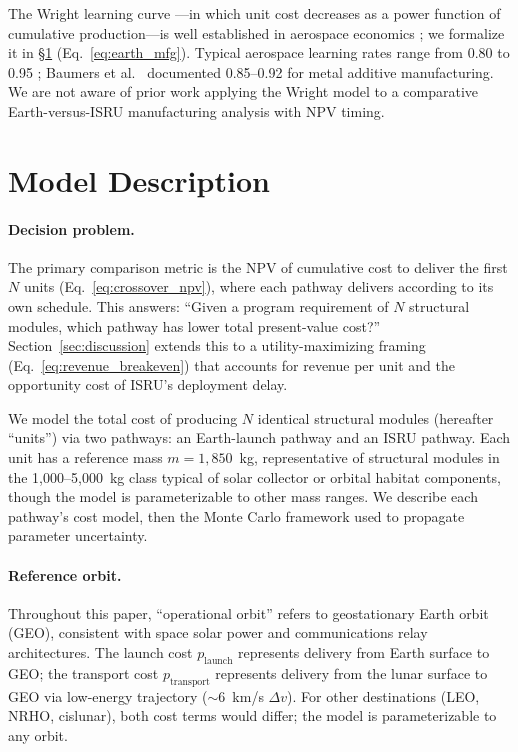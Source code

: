 \documentclass[5p,twocolumn]{elsarticle}
\begin{document}
The Wright learning curve \cite{wright1936}---in which unit cost decreases as a power function of cumulative production---is well established in aerospace economics \cite{dutton1984,argote1990,nagy2013}; we formalize it in \S\ref{sec:model} (Eq.~\ref{eq:earth_mfg}). Typical aerospace learning rates range from 0.80 to 0.95 \cite{wertz2011}; Baumers et al.\ \cite{baumers2016} documented 0.85--0.92 for metal additive manufacturing. We are not aware of prior work applying the Wright model to a comparative Earth-versus-ISRU manufacturing analysis with NPV timing.

\section{Model Description}
\label{sec:model}

\paragraph{Decision problem.} The primary comparison metric is the NPV of cumulative cost to deliver the first $N$ units (Eq.~\ref{eq:crossover_npv}), where each pathway delivers according to its own schedule. This answers: ``Given a program requirement of $N$ structural modules, which pathway has lower total present-value cost?'' Section~\ref{sec:discussion} extends this to a utility-maximizing framing (Eq.~\ref{eq:revenue_breakeven}) that accounts for revenue per unit and the opportunity cost of ISRU's deployment delay.

We model the total cost of producing $N$ identical structural modules (hereafter ``units'') via two pathways: an Earth-launch pathway and an ISRU pathway. Each unit has a reference mass $m = 1{,}850$~kg, representative of structural modules in the 1{,}000--5{,}000~kg class typical of solar collector or orbital habitat components, though the model is parameterizable to other mass ranges. We describe each pathway's cost model, then the Monte Carlo framework used to propagate parameter uncertainty.

\paragraph{Reference orbit.} Throughout this paper, ``operational orbit'' refers to geostationary Earth orbit (GEO), consistent with space solar power and communications relay architectures. The launch cost $p_{\mathrm{launch}}$ represents delivery from Earth surface to GEO; the transport cost $p_{\mathrm{transport}}$ represents delivery from the lunar surface to GEO via low-energy trajectory ($\sim$6~km/s $\Delta v$). For other destinations (LEO, NRHO, cislunar), both cost terms would differ; the model is parameterizable to any orbit.
\end{document}
